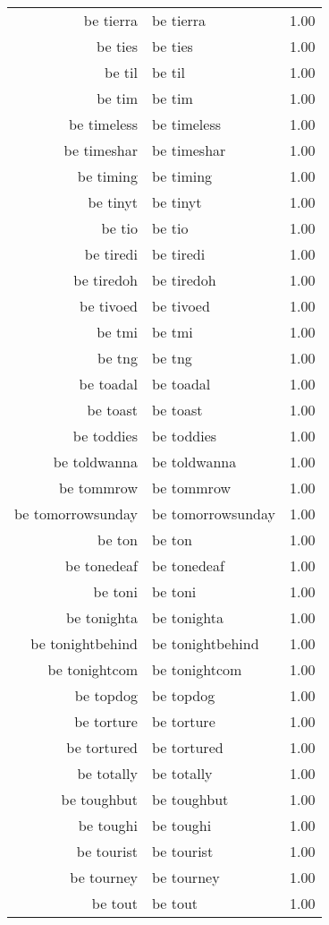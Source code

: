 \begin{table}[ht]
\begin{tabular}{rlr}
  be tierra & be tierra & 1.00 \\ 
  be ties & be ties & 1.00 \\ 
  be til & be til & 1.00 \\ 
  be tim & be tim & 1.00 \\ 
  be timeless & be timeless & 1.00 \\ 
  be timeshar & be timeshar & 1.00 \\ 
  be timing & be timing & 1.00 \\ 
  be tinyt & be tinyt & 1.00 \\ 
  be tio & be tio & 1.00 \\ 
  be tiredi & be tiredi & 1.00 \\ 
  be tiredoh & be tiredoh & 1.00 \\ 
  be tivoed & be tivoed & 1.00 \\ 
  be tmi & be tmi & 1.00 \\ 
  be tng & be tng & 1.00 \\ 
  be toadal & be toadal & 1.00 \\ 
  be toast & be toast & 1.00 \\ 
  be toddies & be toddies & 1.00 \\ 
  be toldwanna & be toldwanna & 1.00 \\ 
  be tommrow & be tommrow & 1.00 \\ 
  be tomorrowsunday & be tomorrowsunday & 1.00 \\ 
  be ton & be ton & 1.00 \\ 
  be tonedeaf & be tonedeaf & 1.00 \\ 
  be toni & be toni & 1.00 \\ 
  be tonighta & be tonighta & 1.00 \\ 
  be tonightbehind & be tonightbehind & 1.00 \\ 
  be tonightcom & be tonightcom & 1.00 \\ 
  be topdog & be topdog & 1.00 \\ 
  be torture & be torture & 1.00 \\ 
  be tortured & be tortured & 1.00 \\ 
  be totally & be totally & 1.00 \\ 
  be toughbut & be toughbut & 1.00 \\ 
  be toughi & be toughi & 1.00 \\ 
  be tourist & be tourist & 1.00 \\ 
  be tourney & be tourney & 1.00 \\ 
  be tout & be tout & 1.00 \\ 

\end{tabular}
\end{table}
